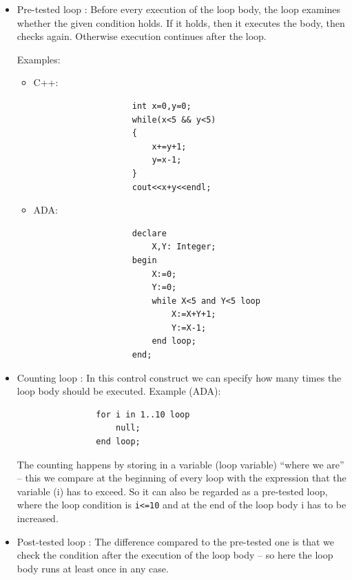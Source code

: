 \documentclass[margin=0px]{article}
\begin{document}
\begin{itemize}
\begin{itemize}
              \item	Pre-tested loop : Before every execution of the loop body, the loop examines whether the given
                    condition holds. If it holds, then it executes the body, then checks again. Otherwise execution continues
                    after the loop.

                    Examples:
                    \begin{itemize}
                        \item	C++:
                              \begin{verbatim}
                    int x=0,y=0;
                    while(x<5 && y<5)
                    {
                        x+=y+1;
                        y=x-1;
                    }
                    cout<<x+y<<endl;
                \end{verbatim}

                        \item	ADA:
                              \begin{verbatim}
                    declare
                        X,Y: Integer;
                    begin
                        X:=0;
                        Y:=0;
                        while X<5 and Y<5 loop
                            X:=X+Y+1;
                            Y:=X-1;
                        end loop;
                    end;
                \end{verbatim}
                    \end{itemize}

              \item	Counting loop : In this control construct we can specify how many times the loop body
                    should be executed.
                    Example (ADA):
                    \begin{verbatim}
                for i in 1..10 loop
                    null;
                end loop;
            \end{verbatim}
                    The counting happens by storing in a variable (loop variable) ``where we are'' -- this we compare
                    at the beginning of every loop with the expression that the variable (i) has to exceed. So it
                    can also be regarded as a pre-tested loop, where the loop condition is \texttt{i<=10} and at the end of the loop body
                    i has to be increased.

              \item	Post-tested loop : The difference compared to the pre-tested one is that we check the condition after the
                    execution of the loop body -- so here the loop body runs at least once in any case.


\end{itemize}
\end{itemize}
\end{document}
